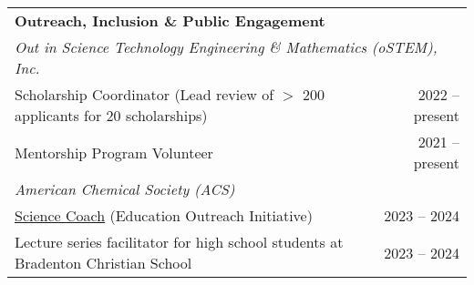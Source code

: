 \documentclass[letterpaper,11pt]{article}
\begin{document}
\begin{longtable}{@{}p{}r@{}}
  \multicolumn{2}{l}{\hspace{-3mm} \bf{Outreach, Inclusion \& Public Engagement}}                                                                                                                                                                                                               \\ [4pt]
  \multicolumn{2}{l}{\hspace{1mm} \textit{Out in Science Technology Engineering \& Mathematics (oSTEM), Inc.}}                                                                                                                                                                                  \\ [3pt]
  \hspace{7mm} Scholarship Coordinator (Lead review of $>$ 200 applicants for 20 scholarships)                                                                                                           & 2022 -- present                                                             \\ [3pt]
  \hspace{7mm} Mentorship Program Volunteer                                                                                                                                                                       & 2021 -- present                                                             \\ [4pt]
  \multicolumn{2}{l}{\hspace{1mm} \textit{American Chemical Society (ACS)}}                                                                                                                                                                                                                     \\ [3pt]
  \hspace{7mm} \href{https://www.acs.org/education/outreach/science-coaches.html}{Science Coach} (Education Outreach Initiative)                                                                                  & 2023 -- 2024                                                                \\ [3pt]
  \hspace{7mm} Lecture series facilitator for high school students at Bradenton Christian School                                                                                                                  & 2023 -- 2024                                                                \\ [4pt]

\end{longtable}
\end{document}
